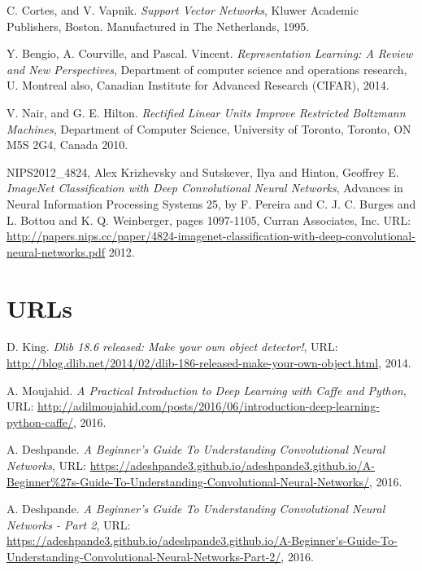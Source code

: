 \documentclass[a4paper,11pt]{book}
\begin{document}
\begin{thebibliography}{99}
	C. Cortes, and V. Vapnik. %
	\textit{Support Vector Networks}, %
	Kluwer Academic Publishers, Boston. Manufactured in The Netherlands,
	1995.	%
	
	Y. Bengio, A. Courville, and Pascal. Vincent. %
	\textit{Representation Learning: A Review and New Perspectives}, %
	Department of computer science and operations research, U. Montreal 
	also, Canadian Institute for Advanced Research (CIFAR),
	2014.	%
	
	V. Nair, and G. E. Hilton. %
	\textit{Rectified Linear Units Improve Restricted Boltzmann Machines}, %
	Department of Computer Science, University of Toronto, Toronto, ON M5S 2G4, Canada
	2010.	%
	
	NIPS2012\_4824,
	Alex Krizhevsky and Sutskever, Ilya and Hinton, Geoffrey E. %
	\textit{ImageNet Classification with Deep Convolutional Neural Networks}, %
	Advances in Neural Information Processing Systems 25, by %
	F. Pereira and C. J. C. Burges and L. Bottou and K. Q. Weinberger, pages 1097-1105,%
	Curran Associates, Inc.
	URL: \url{http://papers.nips.cc/paper/4824-imagenet-classification-with-deep-convolutional-neural-networks.pdf}
	2012.	%
	
	\section{URLs}
	D. King. 
	\textit{Dlib 18.6 released: Make your own object detector!}, 
	URL: \url{http://blog.dlib.net/2014/02/dlib-186-released-make-your-own-object.html}, 
	2014.
	
	A. Moujahid. 
	\textit{A Practical Introduction to Deep Learning with Caffe and Python}, 
	URL: \url{http://adilmoujahid.com/posts/2016/06/introduction-deep-learning-python-caffe/}, 
	2016.
	
	A. Deshpande. 
	\textit{A Beginner's Guide To Understanding Convolutional Neural Networks}, 
	URL: \url{https://adeshpande3.github.io/adeshpande3.github.io/A-Beginner%27s-Guide-To-Understanding-Convolutional-Neural-Networks/}, 
		2016.
		
	A. Deshpande. 
	\textit{A Beginner's Guide To Understanding Convolutional Neural Networks - Part 2}, 
	URL: \url{https://adeshpande3.github.io/adeshpande3.github.io/A-Beginner's-Guide-To-Understanding-Convolutional-Neural-Networks-Part-2/}, 
	2016.
	

\end{thebibliography}
\end{document}

